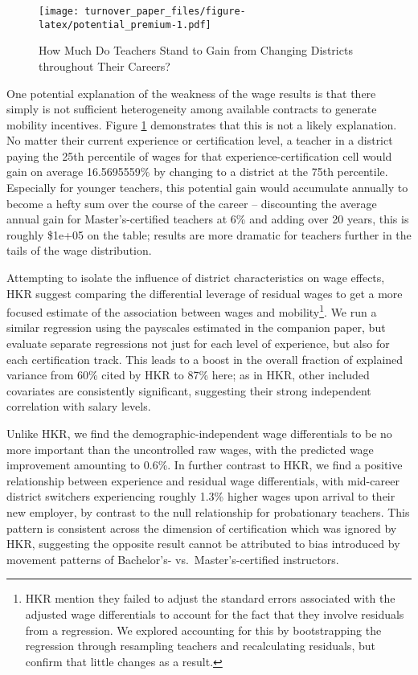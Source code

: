 \documentclass[12pt,]{article}
\let\rmarkdownfootnote\footnote%
\def\footnote{\protect\rmarkdownfootnote}
\begin{document}
\begin{figure}[htbp]
\centering
\texttt{[image: turnover\_paper\_files/figure-latex/potential\_premium-1.pdf]}
\caption{\label{fig:premia}How Much Do Teachers Stand to Gain from
Changing Districts throughout Their Careers?}
\end{figure}

One potential explanation of the weakness of the wage results is that
there simply is not sufficient heterogeneity among available contracts
to generate mobility incentives. Figure \ref{fig:premia} demonstrates
that this is not a likely explanation. No matter their current
experience or certification level, a teacher in a district paying the
25th percentile of wages for that experience-certification cell would
gain on average 16.5695559\% by changing to a district at the 75th
percentile. Especially for younger teachers, this potential gain would
accumulate annually to become a hefty sum over the course of the career
-- discounting the average annual gain for Master's-certified teachers
at 6\% and adding over 20 years, this is roughly \$1e+05 on the table;
results are more dramatic for teachers further in the tails of the wage
distribution.

Attempting to isolate the influence of district characteristics on wage
effects, HKR suggest comparing the differential leverage of residual
wages to get a more focused estimate of the association between wages
and mobility\footnote{HKR mention they failed to adjust the standard
  errors associated with the adjusted wage differentials to account for
  the fact that they involve residuals from a regression. We explored
  accounting for this by bootstrapping the regression through resampling
  teachers and recalculating residuals, but confirm that little changes
  as a result.}. We run a similar regression using the payscales
estimated in the companion paper, but evaluate separate regressions not
just for each level of experience, but also for each certification
track. This leads to a boost in the overall fraction of explained
variance from 60\% cited by HKR to 87\% here; as in HKR, other included
covariates are consistently significant, suggesting their strong
independent correlation with salary levels.

Unlike HKR, we find the demographic-independent wage differentials to be
no more important than the uncontrolled raw wages, with the predicted
wage improvement amounting to 0.6\%. In further contrast to HKR, we find
a positive relationship between experience and residual wage
differentials, with mid-career district switchers experiencing roughly
1.3\% higher wages upon arrival to their new employer, by contrast to
the null relationship for probationary teachers. This pattern is
consistent across the dimension of certification which was ignored by
HKR, suggesting the opposite result cannot be attributed to bias
introduced by movement patterns of Bachelor's- vs.~Master's-certified
instructors.
\end{document}
